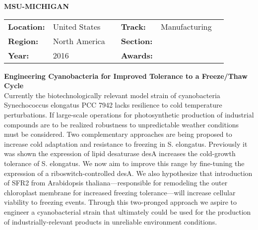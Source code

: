 \textbf{\uppercase{MSU-Michigan}} \FloatBarrier \begin{table}[h] \begin{tabular}{lp{2.5cm}llll} \textbf{Location:} & United States & \multicolumn{1}{|l}{} & \textbf{Track:}   & Manufacturing \\ \textbf{Region:}   & North America   & \multicolumn{1}{|l}{} & \textbf{Section:} &  \\ \textbf{Year:}     & 2016   & \multicolumn{1}{|l}{} & \textbf{Awards:}  & \end{tabular} \end{table} \FloatBarrier \noindent\textbf{Engineering Cyanobacteria for Improved Tolerance to a Freeze/Thaw Cycle} \vspace{.2cm}\\ 
Currently the biotechnologically relevant model strain of cyanobacteria Synechococcus elongatus PCC 7942 lacks resilience to cold temperature perturbations. If large-scale operations for photosynthetic production of industrial compounds are to be realized robustness to unpredictable weather conditions must be considered. Two complementary approaches are being proposed to increase cold adaptation and resistance to freezing in S. elongatus. Previously it was shown the expression of lipid desaturase desA increases the cold-growth tolerance of S. elongatus. We now aim to improve this range by fine-tuning the expression of a riboswitch-controlled desA. We also hypothesize that introduction of SFR2 from Arabidopsis thaliana—responsible for remodeling the outer chloroplast membrane for increased freezing tolerance—will increase cellular viability to freezing events. Through this two-pronged approach we aspire to engineer a cyanobacterial strain that ultimately could be used for the production of industrially-relevant products in unreliable environment conditions.
\vspace{2cm}

